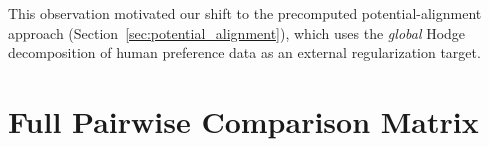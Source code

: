 \documentclass{article}
\begin{document}
This observation motivated our shift to the precomputed potential-alignment approach (Section~\ref{sec:potential_alignment}), which uses the \emph{global} Hodge decomposition of human preference data as an external regularization target.

\section{Full Pairwise Comparison Matrix}
\label{app:pairwise}

\begin{table}[h]
\centering
\caption{Cohen's $d$ for all method pairs (30 seeds). Bold indicates $p < 0.05$.}
\end{table}
\end{document}

